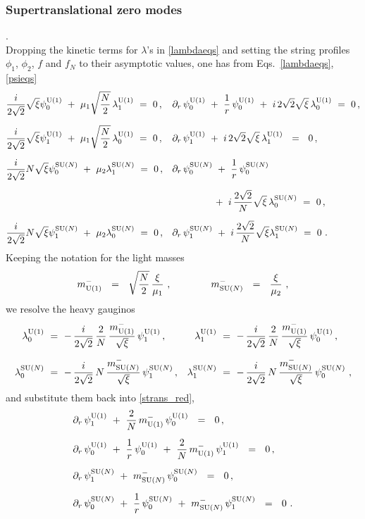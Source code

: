 \documentclass[12pt]{article}
\newcommand{\p}{\partial}
\newcommand{\mUm}{m_{\rm U(1)}^{-}}
\newcommand{\mNm}{m_\text{SU($N$)}^{-}}
\newcommand{\loU}{\lambda_0^{\rm U(1)}}
\newcommand{\llU}{\lambda_1^{\rm U(1)}}
\newcommand{\loN}{\lambda_0^\text{SU($N$)}}
\newcommand{\llN}{\lambda_1^\text{SU($N$)}}
\newcommand{\poU}{\psi_0^{\rm U(1)}}
\newcommand{\plU}{\psi_1^{\rm U(1)}}
\newcommand{\poN}{\psi_0^\text{SU($N$)}}
\newcommand{\plN}{\psi_1^\text{SU($N$)}}
\begin{document}
\subsubsection{Supertranslational zero modes}
	{.}\\[2mm]
	Dropping the kinetic terms for $ \lambda $'s in \eqref{lambdaeqs} and setting the string
	profiles $ \phi_1 $, $ \phi_2 $, $ f $ and $ f_N $ to their asymptotic values, one has
	from Eqs.~\eqref{lambdaeqs}, \eqref{psieqs}
\begin{align}
%
\notag
& 
	\frac{i}{2\sqrt{2}} \sqrt{\xi} \poU ~+~ \mu_1 \sqrt{\frac{N}{2}}\, \llU ~=~ 0\,,   
&&
	\p_r \,\poU ~+~ \frac{1}{r}\,\poU ~+~ i\, 2\sqrt{2}\sqrt{\xi}\, \loU ~=~ 0 \,,
\\[2mm]
%
\notag
& 
	\frac{i}{2\sqrt{2}} \sqrt{\xi} \plU ~+~ \mu_1 \sqrt{\frac{N}{2}}\, \loU ~=~ 0\,,      
&&
	\p_r \, \plU ~+~ i\,2\sqrt{2}\sqrt{\xi}\,\llU ~~=~~ 0\,,
\\[2mm]
%
\label{strans_red}
&
	\frac{i}{2\sqrt{2}} N\sqrt{\xi} \poN ~+~ \mu_2 \llN ~=~ 0\,,     
&&
	\p_r \,\poN ~+~ \frac{1}{r}\, \poN  \\[2mm]
\notag &&& \qquad\qquad
	~+~ i\,\frac{2\sqrt{2}}{N} \sqrt{\xi}\, \loN ~=~ 0\,,
\\[2mm]
%
\notag
&
	\frac{i}{2\sqrt{2}} N\sqrt{\xi} \plN ~+~ \mu_2 \loN ~=~ 0\,,   
&&
	\p_r \,\plN ~+~ i\,\frac{2\sqrt{2}}{N}\sqrt{\xi} \llN ~=~ 0~.
\end{align}
	Keeping the notation for the light masses 
\[
	\mUm ~~=~~ \sqrt{\frac{N}{2}}\, \frac{\xi}{\mu_1}~,  \qquad\qquad \mNm ~~=~~ \frac{\xi}{\mu_2}~,
\]
	we resolve the heavy gauginos
\begin{align}
%
\notag
	\loU & ~=~ -\, \frac{i}{2\sqrt{2}}\, \frac{2}{N}\, \frac{\mUm}{\sqrt{\xi}}\, \plU \,,
&
	\llU & ~=~ -\, \frac{i}{2\sqrt{2}}\, \frac{2}{N}\, \frac{\mUm}{\sqrt{\xi}}\, \poU \,,\\[2mm]
%
\label{heavy_gauginos}
	\loN & ~=~ -\, \frac{i}{2\sqrt{2}}\, N\, \frac{\mNm}{\sqrt{\xi}}\, \plN\,,
&
	\llN & ~=~ -\, \frac{i}{2\sqrt{2}}\, N\, \frac{\mNm}{\sqrt{\xi}}\, \poN ~,
\end{align}
	and substitute them back into \eqref{strans_red},
\begin{align*}
%
	& \p_r\, \plU ~+~ \frac{2}{N}\,\mUm\,\poU ~~=~~ 0\,, \\[2mm]
%
	& \p_r\, \poU ~+~ \frac{1}{r}\,\poU ~+~ \frac{2}{N}\,\mUm\,\plU ~~=~~ 0\,, \\[2mm]
%
	& \p_r\, \plN ~+~ \mNm\,\poN ~~=~~ 0 \,,\\[2mm]
%
	& \p_r\, \poN ~+~ \frac{1}{r}\,\poN ~+~ \mNm\,\plN ~~=~~ 0~.
%
\end{align*}
\end{document}
